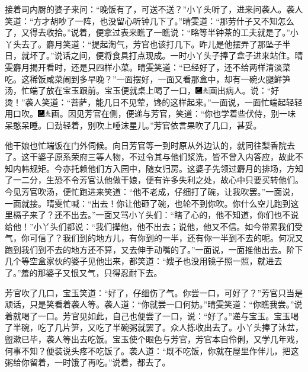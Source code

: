 接着司内厨的婆子来问：``晚饭有了，可送不送？''小丫头听了，进来问袭人。袭人笑道：``方才胡吵了一阵，也没留心听钟几下了。''晴雯道：``那劳什子又不知怎么了，又得去收拾。''说着，便拿过表来瞧了一瞧说：``略等半钟茶的工夫就是了。''小丫头去了。麝月笑道：``提起淘气，芳官也该打几下。昨儿是他摆弄了那坠子半日，就坏了。''说话之间，便将食具打点现成。一时小丫头子捧了盒子进来站住。晴雯麝月揭开看时，还是只四样小菜。晴雯笑道：``已经好了，还不给两样清淡菜吃。这稀饭咸菜闹到多早晚？''一面摆好，一面又看那盒中，却有一碗火腿鲜笋汤，忙端了放在宝玉跟前。宝玉便就桌上喝了一口，{\includegraphics[width=3mm]{../Images/00003}\includegraphics[width=3mm]{../Images/00012}\footnotesize \kaishu 画出病人。}说：``好烫！''袭人笑道：``菩萨，能几日不见荤，馋的这样起来。''一面说，一面忙端起轻轻用口吹。{\includegraphics[width=3mm]{../Images/00003}\includegraphics[width=3mm]{../Images/00012}\footnotesize \kaishu 画。}因见芳官在侧，便递与芳官，笑道：``你也学着些伏侍，别一味呆憨呆睡。口劲轻着，别吹上唾沫星儿。''芳官依言果吹了几口，甚妥。

他干娘也忙端饭在门外伺候。向日芳官等一到时原从外边认的，就同往梨香院去了。这干婆子原系荣府三等人物，不过令其与他们浆洗，皆不曾入内答应，故此不知内帏规矩。今亦托赖他们方入园中，随女归房。这婆子先领过麝月的排场，方知了一二分，生恐不令芳官认他做干娘，便有许多失利之处，故心中只要买转他们。今见芳官吹汤，便忙跑进来笑道：``他不老成，仔细打了碗，让我吹罢。''一面说，一面就接。晴雯忙喊：``出去！你让他砸了碗，也轮不到你吹。你什么空儿跑到这里槅子来了？还不出去。''一面又骂小丫头们：``瞎了心的，他不知道，你们也不说给他！''小丫头们都说：``我们撵他，他不出去；说他，他又不信。如今带累我们受气，你可信了？我们到的地方儿，有你到的一半，还有你一半到不去的呢。何况又跑到我们到不去的地方还不算，又去伸手动嘴的了。''一面说，一面推他出去。阶下几个等空盒家伙的婆子见他出来，都笑道：``嫂子也没用镜子照一照，就进去了。''羞的那婆子又恨又气，只得忍耐下去。

芳官吹了几口，宝玉笑道：``好了，仔细伤了气。你尝一口，可好了？''芳官只当是顽话，只是笑看着袭人等。袭人道：``你就尝一口何妨。''晴雯笑道：``你瞧我尝。''说着就喝了一口。芳官见如此，自己也便尝了一口，说：``好了。''递与宝玉。宝玉喝了半碗，吃了几片笋，又吃了半碗粥就罢了。众人拣收出去了。小丫头捧了沐盆，盥漱已毕，袭人等出去吃饭。宝玉使个眼色与芳官，芳官本自伶俐，又学几年戏，何事不知？便装说头疼不吃饭了。袭人道：``既不吃饭，你就在屋里作伴儿，把这粥给你留着，一时饿了再吃。''说着，都去了。

